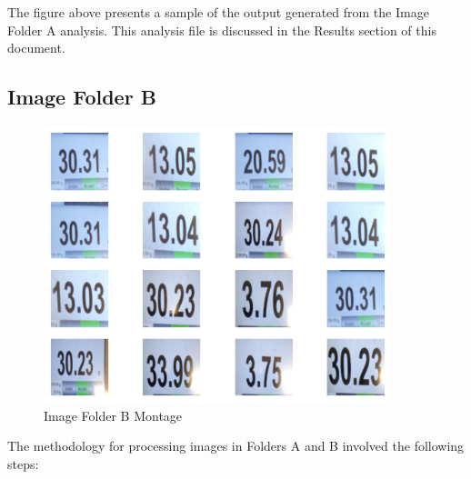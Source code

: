 The figure above presents a sample of the output generated from the Image Folder A analysis. This analysis file is discussed in the Results section of this document.

\newpage
\subsection{Image Folder B}

\begin{figure}[ht]
    \centering
    \includegraphics[width=0.9\textwidth]{Figures/EDA_Charts/3/montage.png}
    \caption[Image Folder B Montage]{Image Folder B Montage}
    \label{fig:Image Folder B Montage}
\end{figure}

The methodology for processing images in Folders A and B involved the following steps:


